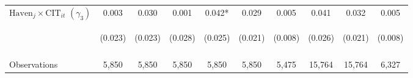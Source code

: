 \begin{center}
\begin{tabular}{lccccccccc}
$\text{Haven}_j\times\text{CIT}_{it}$ $ (\gamma_3)$ & 0.003 & 0.030 & 0.001 & 0.042* & 0.029 & 0.005 & 0.041 & 0.032 & 0.005 \\
 & \begin{footnotesize}(0.023)\end{footnotesize} & \begin{footnotesize}(0.023)\end{footnotesize} & \begin{footnotesize}(0.028)\end{footnotesize} & \begin{footnotesize}(0.025)\end{footnotesize} & \begin{footnotesize}(0.021)\end{footnotesize} & \begin{footnotesize}(0.008)\end{footnotesize} & \begin{footnotesize}(0.026)\end{footnotesize} & \begin{footnotesize}(0.021)\end{footnotesize} & \begin{footnotesize}(0.008)\end{footnotesize} \\
\vspace{4pt} & \begin{footnotesize}\end{footnotesize} & \begin{footnotesize}\end{footnotesize} & \begin{footnotesize}\end{footnotesize} & \begin{footnotesize}\end{footnotesize} & \begin{footnotesize}\end{footnotesize} & \begin{footnotesize}\end{footnotesize} & \begin{footnotesize}\end{footnotesize} & \begin{footnotesize}\end{footnotesize} & \begin{footnotesize}\end{footnotesize} \\
Observations & 5,850 & 5,850 & 5,850 & 5,850 & 5,850 & 5,475 & 15,764 & 15,764 & 6,327 \\

\end{tabular}
\end{center}
